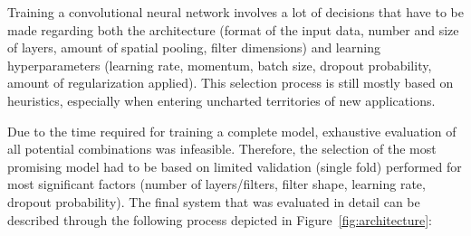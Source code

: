 \documentclass{article}
\begin{document}
Training a convolutional neural network involves a lot of decisions that have to be made regarding both the architecture (format of the input data, number and size of layers, amount of spatial pooling, filter dimensions) and learning hyperparameters (learning rate, momentum, batch size, dropout probability, amount of regularization applied). This selection process is still mostly based on heuristics, especially when entering uncharted territories of new applications.

Due to the time required for training a complete model, exhaustive evaluation of all potential combinations was infeasible. Therefore, the selection of the most promising model had to be based on limited validation (single fold) performed for most significant factors (number of layers/filters, filter shape, learning rate, dropout probability). The final system that was evaluated in detail can be described through the following process depicted in Figure~\ref{fig:architecture}:
\end{document}

